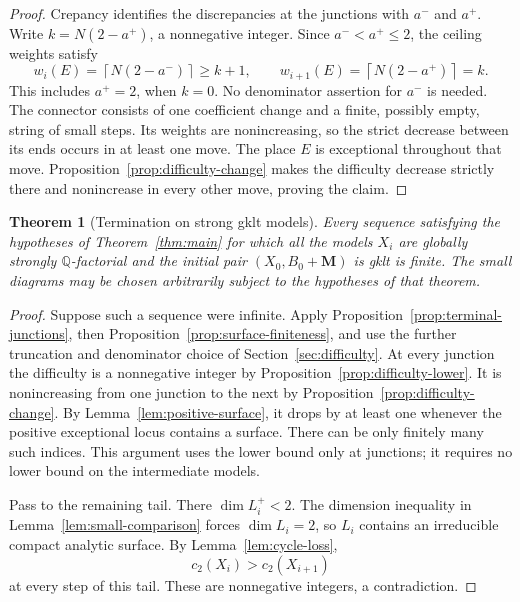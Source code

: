 \documentclass[11pt]{amsart}
\newtheorem{theorem}{Theorem}[section]
\theoremstyle{definition}
\theoremstyle{remark}
\numberwithin{equation}{section}
\newcommand{\Q}{\mathbb{Q}}
\newcommand{\M}{\mathbf{M}}
\begin{document}
\begin{proof}
Crepancy identifies the discrepancies at the junctions with \(a^-\) and
\(a^+\).  Write \(k=N(2-a^+)\), a nonnegative integer.  Since
\(a^-<a^+\leq2\), the ceiling weights satisfy
\[
 w_i(E)=\left\lceil N(2-a^-)\right\rceil
 \geq k+1,
 \qquad
 w_{i+1}(E)=\left\lceil N(2-a^+)\right\rceil=k.
\]
This includes \(a^+=2\), when \(k=0\).  No denominator assertion for
\(a^-\) is needed.  The connector consists of one coefficient change and
a finite, possibly empty, string of small steps.  Its weights are
nonincreasing, so the strict decrease between its ends occurs in at least
one move.  The place \(E\) is exceptional throughout that move.
Proposition~\ref{prop:difficulty-change} makes the difficulty decrease
strictly there and nonincrease in every other move, proving the claim.
\end{proof}

\begin{theorem}[Termination on strong gklt models]\label{thm:strong-gklt}
Every sequence satisfying the hypotheses of Theorem~\ref{thm:main} for
which all the models \(X_i\) are globally strongly \(\Q\)-factorial and
the initial pair \((X_0,B_0+\M)\) is gklt is finite.  The small diagrams
may be chosen arbitrarily subject to the hypotheses of that theorem.
\end{theorem}

\begin{proof}
Suppose such a sequence were infinite.  Apply
Proposition~\ref{prop:terminal-junctions}, then
Proposition~\ref{prop:surface-finiteness}, and use the further truncation
and denominator choice of Section~\ref{sec:difficulty}.  At every junction
the difficulty is a nonnegative integer by
Proposition~\ref{prop:difficulty-lower}.  It is nonincreasing from one
junction to the next by Proposition~\ref{prop:difficulty-change}.  By
Lemma~\ref{lem:positive-surface}, it drops by at least one whenever the
positive exceptional locus contains a surface.  There can be only finitely
many such indices.  This argument uses the lower bound only at junctions;
it requires no lower bound on the intermediate models.

Pass to the remaining tail.  There \(\dim L_i^+<2\).  The dimension
inequality in Lemma~\ref{lem:small-comparison} forces \(\dim L_i=2\), so
\(L_i\) contains an irreducible compact analytic surface.  By
Lemma~\ref{lem:cycle-loss},
\[
 c_2(X_i)>c_2(X_{i+1})
\]
at every step of this tail.  These are nonnegative integers, a
contradiction.
\end{proof}
\end{document}
